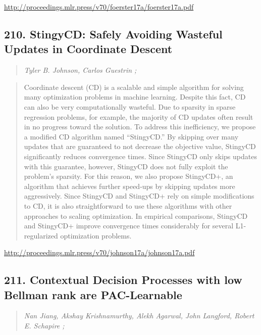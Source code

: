 \documentclass{article}
\begin{document}
\href{http://proceedings.mlr.press/v70/foerster17a/foerster17a.pdf}{http://proceedings.mlr.press/v70/foerster17a/foerster17a.pdf}

\subsection{210. StingyCD: Safely Avoiding Wasteful Updates in Coordinate Descent}

\begin{quote}
\footnotesize{\textit{Tyler B. Johnson, Carlos Guestrin ;}}
\end{quote}

\begin{quote}
    Coordinate descent (CD) is a scalable and simple algorithm for solving many optimization problems in machine learning. Despite this fact, CD can also be very computationally wasteful. Due to sparsity in sparse regression problems, for example, the majority of CD updates often result in no progress toward the solution. To address this inefficiency, we propose a modified CD algorithm named “StingyCD.” By skipping over many updates that are guaranteed to not decrease the objective value, StingyCD significantly reduces convergence times. Since StingyCD only skips updates with this guarantee, however, StingyCD does not fully exploit the problem’s sparsity. For this reason, we also propose StingyCD+, an algorithm that achieves further speed-ups by skipping updates more aggressively. Since StingyCD and StingyCD+ rely on simple modifications to CD, it is also straightforward to use these algorithms with other approaches to scaling optimization. In empirical comparisons, StingyCD and StingyCD+ improve convergence times considerably for several L1-regularized optimization problems.  \end{quote}

\href{http://proceedings.mlr.press/v70/johnson17a/johnson17a.pdf}{http://proceedings.mlr.press/v70/johnson17a/johnson17a.pdf}

\subsection{211. Contextual Decision Processes with low Bellman rank are PAC-Learnable}

\begin{quote}
\footnotesize{\textit{Nan Jiang, Akshay Krishnamurthy, Alekh Agarwal, John Langford, Robert E. Schapire ;}}
\end{quote}
\end{document}
